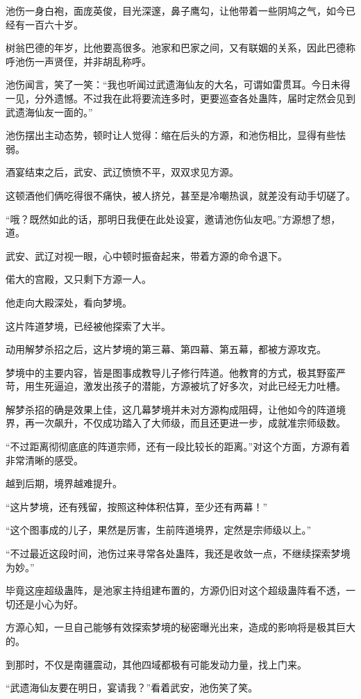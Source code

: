 \begin{this_body}
池伤一身白袍，面庞英俊，目光深邃，鼻子鹰勾，让他带着一些阴鸠之气，如今已经有一百六十岁。

树翁巴德的年岁，比他要高很多。池家和巴家之间，又有联姻的关系，因此巴德称呼池伤一声贤侄，并非胡乱称呼。

池伤闻言，笑了一笑：“我也听闻过武遗海仙友的大名，可谓如雷贯耳。今日未得一见，分外遗憾。不过我在此将要流连多时，更要巡查各处蛊阵，届时定然会见到武遗海仙友一面的。”

池伤摆出主动态势，顿时让人觉得：缩在后头的方源，和池伤相比，显得有些怯弱。

酒宴结束之后，武安、武辽愤愤不平，双双求见方源。

这顿酒他们俩吃得很不痛快，被人挤兑，甚至是冷嘲热讽，就差没有动手切磋了。

“哦？既然如此的话，那明日我便在此处设宴，邀请池伤仙友吧。”方源想了想，道。

武安、武辽对视一眼，心中顿时振奋起来，带着方源的命令退下。

偌大的宫殿，又只剩下方源一人。

他走向大殿深处，看向梦境。

这片阵道梦境，已经被他探索了大半。

动用解梦杀招之后，这片梦境的第三幕、第四幕、第五幕，都被方源攻克。

梦境中的主要内容，皆是图事成教导儿子修行阵道。他教育的方式，极其野蛮严苛，用生死逼迫，激发出孩子的潜能，方源被坑了好多次，对此已经无力吐槽。

解梦杀招的确是效果上佳，这几幕梦境并未对方源构成阻碍，让他如今的阵道境界，再一次飙升，不仅成功踏入了大师级，而且还更进一步，成就准宗师级数。

“不过距离彻彻底底的阵道宗师，还有一段比较长的距离。”对这个方面，方源有着非常清晰的感受。

越到后期，境界越难提升。

“这片梦境，还有残留，按照这种体积估算，至少还有两幕！”

“这个图事成的儿子，果然是厉害，生前阵道境界，定然是宗师级以上。”

“不过最近这段时间，池伤过来寻常各处蛊阵，我还是收敛一点，不继续探索梦境为妙。”

毕竟这座超级蛊阵，是池家主持组建布置的，方源仍旧对这个超级蛊阵看不透，一切还是小心为好。

方源心知，一旦自己能够有效探索梦境的秘密曝光出来，造成的影响将是极其巨大的。

到那时，不仅是南疆震动，其他四域都极有可能发动力量，找上门来。

“武遗海仙友要在明日，宴请我？”看着武安，池伤笑了笑。


\end{this_body}
